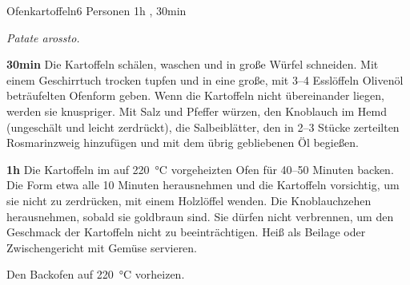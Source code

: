 \documentclass[../recipe-collections/cooking.tex]{subfiles}
\begin{document}
\begin{recipe}{Ofenkartoffeln}{6 Personen }{1h , 30min }

  \freeform{}\textit{Patate arossto.}


  \textbf{30min}
  Die Kartoffeln schälen, waschen und in große Würfel schneiden.
  Mit einem Geschirrtuch trocken tupfen und in eine große, mit 3–4 Esslöffeln Olivenöl beträufelten Ofenform geben.
  Wenn die Kartoffeln nicht übereinander liegen, werden sie knuspriger.
  Mit Salz und Pfeffer würzen, den Knoblauch im Hemd (ungeschält und leicht zerdrückt), die Salbeiblätter, den in 2–3 Stücke zerteilten Rosmarinzweig hinzufügen und mit dem übrig gebliebenen Öl begießen.

  \newstep{}\textbf{1h}
  Die Kartoffeln im auf 220 °C vorgeheizten Ofen für 40–50 Minuten backen.
  Die Form etwa alle 10 Minuten herausnehmen und die Kartoffeln vorsichtig, um sie nicht zu zerdrücken, mit einem Holzlöffel wenden.
  Die Knoblauchzehen herausnehmen, sobald sie goldbraun sind.
  Sie dürfen nicht verbrennen, um den Geschmack der Kartoffeln nicht zu beeinträchtigen.
  Heiß als Beilage oder Zwischengericht mit Gemüse servieren.

  \freeform{}\hrulefill{}

  \freeform{}
  Den Backofen auf 220 °C vorheizen.

\end{recipe}
\end{document}
